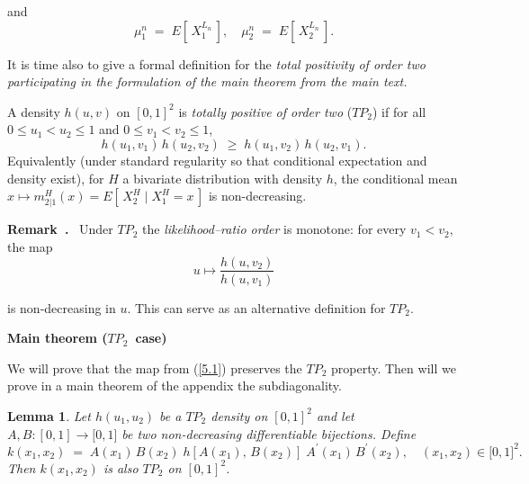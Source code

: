 \documentclass[onecolumn]{article}
\newtheorem{definition}[theorem]{Definition}
\let\olddefinition\definition
\let\endolddefinition\enddefinition
\renewenvironment{definition}{\olddefinition\normalfont}{\endolddefinition}
\newtheorem{lemma}[theorem]{Lemma}
\newenvironment{remark}{  \refstepcounter{theorem}  \par\medskip\noindent\textbf{Remark~\thetheorem.}\rmfamily\ }{\par\medskip}
\begin{document}
and 
\begin{equation}
\mu _{1}^{n}\;=\;E[\,X_{1}^{L_{n}}\,],\quad \mu
_{2}^{n}\;=\;E[\,X_{2}^{L_{n}}\,].  \label{304}
\end{equation}

It is time also to give a formal definition for the \textit{total positivity
of order two participating in the formulation of the main theorem from the
main text.}

\begin{definition}
\label{def-tp2} A density $h(u,v)$ on $[0,1]^{2}$ is \textit{totally
positive of order two} ($TP_{2}$) if for all $0\leq u_{1}<u_{2}\leq 1$ and $%
0\leq v_{1}<v_{2}\leq 1$, 
\begin{equation}
h(u_{1},v_{1})\,h(u_{2},v_{2})\;\geq \;h(u_{1},v_{2})\,h(u_{2},v_{1}).
\label{307}
\end{equation}%
Equivalently (under standard regularity so that conditional expectation and
density exist), for $H$ a bivariate distribution with density $h$, the
conditional mean $x\mapsto m_{2|1}^{H}(x)=E[\,X_{2}^{H}\mid X_{1}^{H}=x\,]$
is non-decreasing.
\end{definition}

\begin{remark}
Under $TP_{2}$ the \textit{likelihood--ratio order} is monotone: for every $%
v_{1}<v_{2},$ the map%
\begin{equation}
u\mapsto \frac{h(u,v_{2})}{h(u,v_{1})}  \label{307.1}
\end{equation}

is non-decreasing in $u$. This can serve as an alternative definition for $%
TP_{2}.$
\end{remark}

\begin{flushleft}
\textbf{Main theorem (}$TP_{2}$\textbf{\ case)}
\end{flushleft}

We will prove that the map from (\ref{5.1}) preserves the $TP_{2}$ property.
Then will we prove in a main theorem of the appendix the subdiagonality.

\begin{lemma}
\label{tp-preservation} Let $h(u_{1},u_{2})$ be a $TP_{2}$ density on $%
[0,1]^{2}$ and let $A,B:[0,1]\rightarrow \lbrack 0,1]$ be two non-decreasing
differentiable bijections. Define 
\begin{equation*}
k(x_{1},x_{2})\;=\;A(x_{1})\,B(x_{2})\;h[A(x_{1}),\,B(x_{2})]\;A^{\prime
}(x_{1})\,B^{\prime }(x_{2}),\quad (x_{1},x_{2})\in \lbrack 0,1]^{2}.
\end{equation*}%
Then $k(x_{1},x_{2})$ is also $TP_{2}$ on $[0,1]^{2}$.
\end{lemma}
\end{document}
